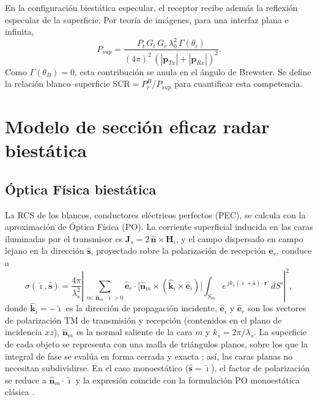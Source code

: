 \documentclass[11pt,a4paper]{report}
\newcommand{\vect}[1]{\bm{#1}}
\newcommand{\uv}[1]{\hat{\bm{#1}}}
\begin{document}
En la configuración biestática especular, el receptor recibe además la
reflexión especular de la superficie. Por teoría de imágenes, para una
interfaz plana e infinita,
\begin{equation}
  P_{sup} = \frac{P_t\,G_t\,G_r\,\lambda_0^2\,\Gamma(\theta_i)}
                 {(4\pi)^2\,\left(|\vect{p}_{Tx}|+|\vect{p}_{Rx}|\right)^2}.
  \label{eq:superficie}
\end{equation}
Como $\Gamma(\theta_B)=0$, esta contribución se anula en el ángulo de
Brewster. Se define la relación blanco--superficie
$\mathrm{SCR}=P_r^B/P_{sup}$ para cuantificar esta competencia.

\section{Modelo de sección eficaz radar biestática}
\label{sec:rcs}

\subsection{Óptica Física biestática}

La RCS de los blancos, conductores eléctricos perfectos (PEC), se calcula
con la aproximación de Óptica Física (PO). La corriente superficial inducida
en las caras iluminadas por el transmisor es
$\vect{J}_s=2\,\uv{n}\times\vect{H}_i$, y el campo dispersado en campo lejano
en la dirección $\uv{s}$, proyectado sobre la polarización de recepción
$\uv{e}_r$, conduce a
\begin{equation}
  \sigma(\uv{\imath},\uv{s}) = \frac{4\pi}{\lambda_s^2}
  \left|\,\sum_{m:\,\uv{n}_m\cdot\uv{\imath}>0}
  \uv{e}_r\cdot\big[\uv{n}_m\times(\uv{k}_i\times\uv{e}_i)\big]
  \int_{S_m} e^{\,j k_s(\uv{\imath}+\uv{s})\cdot\vect{r}'}\,dS'\right|^2 ,
  \label{eq:po}
\end{equation}
donde $\uv{k}_i=-\uv{\imath}$ es la dirección de propagación incidente,
$\uv{e}_i$ y $\uv{e}_r$ son los vectores de polarización TM de transmisión
y recepción (contenidos en el plano de incidencia $xz$), $\uv{n}_m$ es la
normal saliente de la cara $m$ y $k_s=2\pi/\lambda_s$. La superficie de cada
objeto se representa con una malla de triángulos planos, sobre los que la
integral de fase se evalúa en forma cerrada y exacta
\cite{gordon1975}; así, las caras planas no necesitan subdividirse. En el
caso monoestático ($\uv{s}=\uv{\imath}$), el factor de polarización se
reduce a $\uv{n}_m\cdot\uv{\imath}$ y la expresión coincide con la
formulación PO monoestática clásica \cite{knott1993}.
\end{document}
